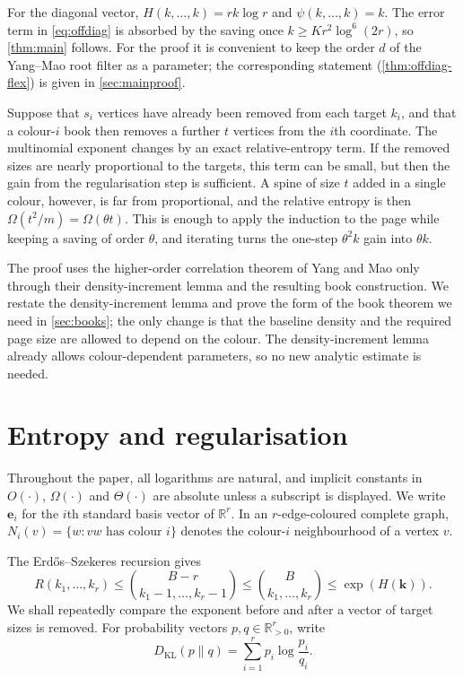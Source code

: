 \documentclass[11pt]{article}
\theoremstyle{definition}
\newcommand{\R}{\mathbb R}
\newcommand{\kk}{\mathbf k}
\newcommand{\ee}{\mathbf e}
\newcommand{\Ent}{H}
\newcommand{\pot}{\psi}
\newcommand{\KL}{D_{\mathrm{KL}}}
\begin{document}
For the diagonal vector, $\Ent(k,\ldots,k)=rk\log r$ and
$\pot(k,\ldots,k)=k$.  The error term in \eqref{eq:offdiag} is absorbed by the
saving once $k\ge K r^2\log^6(2r)$, so \cref{thm:main} follows.  For the proof it
is convenient to keep the order $d$ of the Yang--Mao root filter as a
parameter; the corresponding statement (\cref{thm:offdiag-flex}) is given in
\cref{sec:mainproof}.

Suppose
that $s_i$ vertices have already been removed from each target $k_i$, and
that a colour-$i$ book then removes a further $t$ vertices from the $i$th
coordinate.  The multinomial exponent changes by an exact relative-entropy
term.  If the removed sizes are nearly proportional to the targets, this
term can be small, but then the gain from the regularisation step is
sufficient.  A spine of size $t$ added in a single colour, however, is far from
proportional, and the relative entropy is then
$\Omega(t^2/m)=\Omega(\theta t)$.  This is enough to apply the induction to
the page while keeping a saving of order $\theta$, and iterating turns the
one-step $\theta^2k$ gain into $\theta k$.

The proof uses the higher-order correlation theorem of Yang and Mao only
through their density-increment lemma and the resulting book construction.
We restate the density-increment lemma and prove the form of the book theorem
we need in \cref{sec:books}; the only change is that the baseline density and
the required page size are allowed to depend on the colour.  The
density-increment lemma already allows colour-dependent parameters, so no
new analytic estimate is needed.

\section{Entropy and regularisation}\label{sec:prelim}
Throughout the paper, all logarithms are natural, and implicit constants in
$O(\cdot)$, $\Omega(\cdot)$ and $\Theta(\cdot)$ are absolute unless a
subscript is displayed.  We write $\ee_i$ for the $i$th standard basis vector
of $\R^r$.  In an $r$-edge-coloured complete graph,
$N_i(v)=\{w:vw\text{ has colour }i\}$ denotes the colour-$i$ neighbourhood of
a vertex $v$.

The Erd\H{o}s--Szekeres recursion gives
\begin{equation}\label{eq:ES}
 R(k_1,\ldots,k_r)
 \le \binom{B-r}{k_1-1,\ldots,k_r-1}
 \le \binom{B}{k_1,\ldots,k_r}
 \le \exp(\Ent(\kk)).
\end{equation}
We shall repeatedly compare the exponent before and after a vector of target
sizes is removed.  For probability vectors $p,q\in\R_{>0}^r$, write
\[
 \KL(p\|q)=\sum_{i=1}^r p_i\log\frac{p_i}{q_i}.
\]
\end{document}
